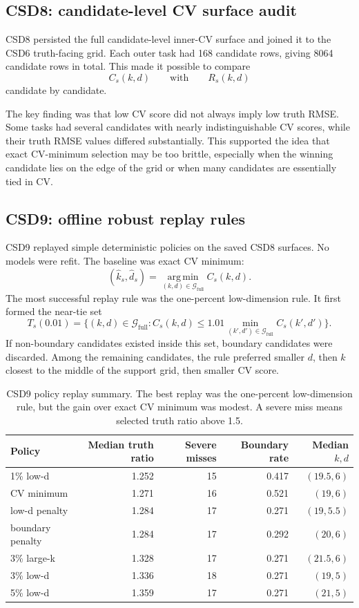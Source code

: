 \documentclass[11pt]{article}
\newcommand{\Gfull}{\mathcal G_{\mathrm{full}}}
\newcommand{\argmin}{\operatorname*{arg\,min}}
\begin{document}
\subsection{CSD8: candidate-level CV surface audit}

CSD8 persisted the full candidate-level inner-CV surface and joined it to the
CSD6 truth-facing grid.  Each outer task had 168 candidate rows, giving 8064
candidate rows in total.  This made it possible to compare
\[
  C_s(k,d)
  \qquad\text{with}\qquad
  R_s(k,d)
\]
candidate by candidate.

The key finding was that low CV score did not always imply low truth RMSE.  Some
tasks had several candidates with nearly indistinguishable CV scores, while their
truth RMSE values differed substantially.  This supported the idea that exact
CV-minimum selection may be too brittle, especially when the winning candidate
lies on the edge of the grid or when many candidates are essentially tied in CV.

\subsection{CSD9: offline robust replay rules}

CSD9 replayed simple deterministic policies on the saved CSD8 surfaces.  No
models were refit.  The baseline was exact CV minimum:
\[
  (\widehat k_s,\widehat d_s)
  =
  \argmin_{(k,d)\in\Gfull} C_s(k,d).
\]
The most successful replay rule was the one-percent low-dimension rule.  It
first formed the near-tie set
\[
  T_s(0.01)
  =
  \{(k,d)\in\Gfull: C_s(k,d)\le 1.01 \min_{(k',d')\in\Gfull} C_s(k',d')\}.
\]
If non-boundary candidates existed inside this set, boundary candidates were
discarded.  Among the remaining candidates, the rule preferred smaller $d$, then
$k$ closest to the middle of the support grid, then smaller CV score.

\begin{table}[htbp]
\centering
\caption{CSD9 policy replay summary.  The best replay was the one-percent
low-dimension rule, but the gain over exact CV minimum was modest.  A severe
miss means selected truth ratio above 1.5.}
\label{tab:csd9}
\begin{tabular}{lrrrr}
\toprule
Policy & Median truth ratio & Severe misses & Boundary rate & Median $k,d$\\
\midrule
1\% low-d      & 1.252 & 15 & 0.417 & $(19.5,6)$\\
CV minimum     & 1.271 & 16 & 0.521 & $(19,6)$\\
low-d penalty  & 1.284 & 17 & 0.271 & $(19,5.5)$\\
boundary penalty & 1.284 & 17 & 0.292 & $(20,6)$\\
3\% large-k    & 1.328 & 17 & 0.271 & $(21.5,6)$\\
3\% low-d      & 1.336 & 18 & 0.271 & $(19,5)$\\
5\% low-d      & 1.359 & 17 & 0.271 & $(21,5)$\\
\bottomrule
\end{tabular}
\end{table}
\end{document}
